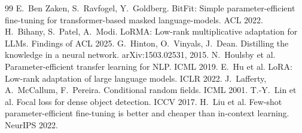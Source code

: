 \documentclass[11pt,a4paper]{article}
\begin{document}
\begin{thebibliography}{99}\small
{} E.~Ben Zaken, S.~Ravfogel, Y.~Goldberg. BitFit: Simple parameter-efficient fine-tuning for transformer-based masked language-models. ACL 2022.
 H.~Bihany, S.~Patel, A.~Modi. LoRMA: Low-rank multiplicative adaptation for LLMs. Findings of ACL 2025.
 G.~Hinton, O.~Vinyals, J.~Dean. Distilling the knowledge in a neural network. arXiv:1503.02531, 2015.
 N.~Houlsby et al. Parameter-efficient transfer learning for NLP. ICML 2019.
 E.~Hu et al. LoRA: Low-rank adaptation of large language models. ICLR 2022.
 J.~Lafferty, A.~McCallum, F.~Pereira. Conditional random fields. ICML 2001.
 T.-Y.~Lin et al. Focal loss for dense object detection. ICCV 2017.
 H.~Liu et al. Few-shot parameter-efficient fine-tuning is better and cheaper than in-context learning. NeurIPS 2022.
\end{thebibliography}
\end{document}
